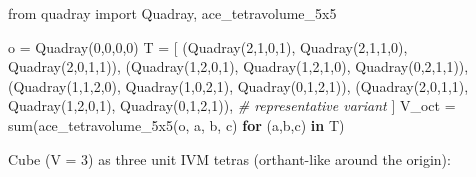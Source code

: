 \documentclass[
]{article}
\newenvironment{Shaded}{}{}
\newcommand{\BuiltInTok}[1]{#1}
\newcommand{\CommentTok}[1]{\textcolor[rgb]{0.38,0.63,0.69}{\textit{#1}}}
\newcommand{\ControlFlowTok}[1]{\textcolor[rgb]{0.00,0.44,0.13}{\textbf{#1}}}
\newcommand{\DecValTok}[1]{\textcolor[rgb]{0.25,0.63,0.44}{#1}}
\newcommand{\ImportTok}[1]{#1}
\newcommand{\KeywordTok}[1]{\textcolor[rgb]{0.00,0.44,0.13}{\textbf{#1}}}
\newcommand{\NormalTok}[1]{#1}
\newcommand{\OperatorTok}[1]{\textcolor[rgb]{0.40,0.40,0.40}{#1}}
\begin{document}
\begin{Shaded}
\begin{Highlighting}[]
\ImportTok{from}\NormalTok{ quadray }\ImportTok{import}\NormalTok{ Quadray, ace\_tetravolume\_5x5}

\NormalTok{o }\OperatorTok{=}\NormalTok{ Quadray(}\DecValTok{0}\NormalTok{,}\DecValTok{0}\NormalTok{,}\DecValTok{0}\NormalTok{,}\DecValTok{0}\NormalTok{)}
\NormalTok{T }\OperatorTok{=}\NormalTok{ [}
\NormalTok{    (Quadray(}\DecValTok{2}\NormalTok{,}\DecValTok{1}\NormalTok{,}\DecValTok{0}\NormalTok{,}\DecValTok{1}\NormalTok{), Quadray(}\DecValTok{2}\NormalTok{,}\DecValTok{1}\NormalTok{,}\DecValTok{1}\NormalTok{,}\DecValTok{0}\NormalTok{), Quadray(}\DecValTok{2}\NormalTok{,}\DecValTok{0}\NormalTok{,}\DecValTok{1}\NormalTok{,}\DecValTok{1}\NormalTok{)),}
\NormalTok{    (Quadray(}\DecValTok{1}\NormalTok{,}\DecValTok{2}\NormalTok{,}\DecValTok{0}\NormalTok{,}\DecValTok{1}\NormalTok{), Quadray(}\DecValTok{1}\NormalTok{,}\DecValTok{2}\NormalTok{,}\DecValTok{1}\NormalTok{,}\DecValTok{0}\NormalTok{), Quadray(}\DecValTok{0}\NormalTok{,}\DecValTok{2}\NormalTok{,}\DecValTok{1}\NormalTok{,}\DecValTok{1}\NormalTok{)),}
\NormalTok{    (Quadray(}\DecValTok{1}\NormalTok{,}\DecValTok{1}\NormalTok{,}\DecValTok{2}\NormalTok{,}\DecValTok{0}\NormalTok{), Quadray(}\DecValTok{1}\NormalTok{,}\DecValTok{0}\NormalTok{,}\DecValTok{2}\NormalTok{,}\DecValTok{1}\NormalTok{), Quadray(}\DecValTok{0}\NormalTok{,}\DecValTok{1}\NormalTok{,}\DecValTok{2}\NormalTok{,}\DecValTok{1}\NormalTok{)),}
\NormalTok{    (Quadray(}\DecValTok{2}\NormalTok{,}\DecValTok{0}\NormalTok{,}\DecValTok{1}\NormalTok{,}\DecValTok{1}\NormalTok{), Quadray(}\DecValTok{1}\NormalTok{,}\DecValTok{2}\NormalTok{,}\DecValTok{0}\NormalTok{,}\DecValTok{1}\NormalTok{), Quadray(}\DecValTok{0}\NormalTok{,}\DecValTok{1}\NormalTok{,}\DecValTok{2}\NormalTok{,}\DecValTok{1}\NormalTok{)),  }\CommentTok{\# representative variant}
\NormalTok{]}
\NormalTok{V\_oct }\OperatorTok{=} \BuiltInTok{sum}\NormalTok{(ace\_tetravolume\_5x5(o, a, b, c) }\ControlFlowTok{for}\NormalTok{ (a,b,c) }\KeywordTok{in}\NormalTok{ T)}
\end{Highlighting}
\end{Shaded}

Cube (V = 3) as three unit IVM tetras (orthant-like around the origin):
\end{document}

